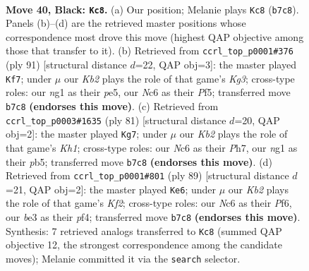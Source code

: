 \documentclass[11pt]{article}
\begin{document}
\clearpage

\begin{figure}[p]\centering
\begin{subfigure}{0.46\textwidth}\centering
\resizebox{\linewidth}{!}{%
\newchessgame
\chessboard[
  setfen={8/1k6/2nb2p1/6P1/p1b5/4B3/8/4K1N1 b - - 15 40},
  showmover=false,
  pgfstyle=straightmove, color=movearrow, markmove={b7-c8}
]}
\caption{}
\end{subfigure}\hfill
\begin{subfigure}{0.46\textwidth}\centering
\resizebox{\linewidth}{!}{%
\newchessgame
\chessboard[
  setfen={8/8/6k1/4Pp2/P2K1B2/5b1p/8/8 b - - 1 46},
  showmover=false,
  pgfstyle=straightmove, color=movearrow, markmove={g6-f7}
]}
\caption{}
\end{subfigure}
\\[4pt]
\begin{subfigure}{0.46\textwidth}\centering
\resizebox{\linewidth}{!}{%
\newchessgame
\chessboard[
  setfen={7k/5p1p/B7/1Pb5/8/8/4K1PP/8 b - - 2 41},
  showmover=false,
  pgfstyle=straightmove, color=movearrow, markmove={h8-g7}
]}
\caption{}
\end{subfigure}\hfill
\begin{subfigure}{0.46\textwidth}\centering
\resizebox{\linewidth}{!}{%
\newchessgame
\chessboard[
  setfen={8/5k2/5p2/2K4p/4bP2/1P5P/3B4/8 b - - 2 45},
  showmover=false,
  pgfstyle=straightmove, color=movearrow, markmove={f7-e6}
]}
\caption{}
\end{subfigure}
\caption{\textbf{Move 40, Black: \texttt{Kc8}.} (a) Our position; Melanie plays \texttt{Kc8} (\texttt{b7c8}). Panels (b)--(d) are the retrieved master positions whose correspondence most drove this move (highest QAP objective among those that transfer to it). (b) Retrieved from \texttt{ccrl\_top\_p0001\#376} (ply 91) [structural distance $d$=22, QAP obj=3]: the master played \texttt{Kf7}; under $\mu$ our \emph{Kb2} plays the role of that game's \emph{Kg3}; cross-type roles: our \emph{n}g1 as their \emph{p}e5, our \emph{N}c6 as their \emph{P}f5; transferred move \texttt{b7c8} \textbf{(endorses this move)}. (c) Retrieved from \texttt{ccrl\_top\_p0003\#1635} (ply 81) [structural distance $d$=20, QAP obj=2]: the master played \texttt{Kg7}; under $\mu$ our \emph{Kb2} plays the role of that game's \emph{Kh1}; cross-type roles: our \emph{N}c6 as their \emph{P}h7, our \emph{n}g1 as their \emph{p}b5; transferred move \texttt{b7c8} \textbf{(endorses this move)}. (d) Retrieved from \texttt{ccrl\_top\_p0001\#801} (ply 89) [structural distance $d$=21, QAP obj=2]: the master played \texttt{Ke6}; under $\mu$ our \emph{Kb2} plays the role of that game's \emph{Kf2}; cross-type roles: our \emph{N}c6 as their \emph{P}f6, our \emph{b}e3 as their \emph{p}f4; transferred move \texttt{b7c8} \textbf{(endorses this move)}. Synthesis: 7 retrieved analogs transferred to \texttt{Kc8} (summed QAP objective 12, the strongest correspondence among the candidate moves); Melanie committed it via the \texttt{search} selector.}
\label{fig:thought-m79}
\end{figure}
\end{document}
